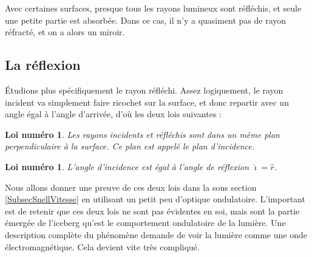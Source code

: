 \documentclass[a4paper,12pt]{book}
\newcommand{\pstTransHom}[5]{%
\pstTranslation{#1}{#2}{#3}[inter]
\pstHomO[HomCoef=#4]{#3}{inter}[#5]
}
\newcommand{\pstDecompForce}[8]{%
  \psset{PointSymbol=none, PointName=none}
\pstTranslation{#3}{#4}{#1}[ibBu]
\pstTranslation{#5}{#6}{#1}[ibBd]

\pstTranslation{#3}{#4}{#2}[jbBu]
\pstTranslation{#5}{#6}{#2}[jbBd]

\pstInterLL{#2}{jbBd}{#1}{ibBu}{#7}
\pstInterLL{#2}{jbBu}{#1}{ibBd}{#8}
}
\newcommand{\pstRayon}[3][linecolor=yellow]{%
  \psset{PointSymbol=none, PointName=none}
\pstMiddleAB{#2}{#3}{inter}
{
\psset{linecolor=red}
\psset{#1}
\psline[ArrowInside=->](#2)(#3)
} %
}
\newcommand{\pstDioptre}[8][Diinter]{%
  \psset{PointSymbol=none, PointName=none}
	\pstGeonode(#2){DiO}(#3){DiP}(#4){DiRi}
	\pstRotation[RotAngle=90]{DiO}{DiP}[DiQ]				%
   	\pstDecompForce{DiO}{DiRi}{DiO}{DiP}{DiO}{DiQ}{DiRix}{DiRiy}		%
  \FPeval{Dicoefrel}{#5/#6}
	\pstTransHom{DiRi}{DiRiy}{DiO}{\Dicoefrel}{DiRex}			%

   	\pstTranslation{DiO}{DiRex}{DiQ}[DiR]
   	\pstInterLC{DiRex}{DiR}{DiO}{DiRi}{#8}{#1}				%

	\pstTranslation{DiRi}{DiRiy}{DiRiy}[#7]					%
}
\newcounter{numloiphyz}
\theoremstyle{mes_exemples}	\newtheorem{exemple}[numtho]{Exemple}
\theoremstyle{mes_tho}
\newtheorem{loiphyz}[numloiphyz]{Loi numéro}
\begin{document}
Avec certaines surfaces, presque tous les rayons lumineux sont réfléchis, et seule une petite partie est absorbée. Dans ce cas, il n'y a quasiment pas de rayon réfracté, et on a alors un miroir.

\subsection{La réflexion}

Étudions plus spécifiquement le rayon réfléchi. Assez logiquement, le rayon incident va simplement \og faire ricochet\fg{} sur la surface, et donc repartir avec un angle égal à l'angle d'arrivée, d'où les deux lois suivantes :

\begin{loiphyz}
Les rayons incidents et réfléchis sont dans un même plan perpendiculaire à la surface. Ce plan est appelé le \emph{plan d'incidence}.
\end{loiphyz}

\begin{loiphyz}
L'angle d'incidence est égal à l'angle de réflexion $\hat \imath=\hat r$.
\end{loiphyz}

Nous allons donner une preuve de ces deux lois dans la sous section \ref{SubsecSnellVitesse} en utilisant un petit peu d'optique ondulatoire. L'important est de retenir que ces deux lois ne sont pas \og évidentes\fg{} en soi, mais sont la partie émergée de l'iceberg qu'est le comportement ondulatoire de la lumière. Une description complète du phénomène demande de voir la lumière comme une onde électromagnétique. Cela devient vite très compliqué.


\newcommand{\prefigreflexion}[1]{%

\pstGeonode(0,0){O}(2,0){P}
\pstRotation[RotAngle=90]{O}{P}[Qi]
\pstHomO[HomCoef=0.5]{O}{Qi}[Q]
\pstRotation[RotAngle=180]{O}{P}[R]
\pstHomO[HomCoef=-1]{O}{Q}[S]
\pstRotation[RotAngle=-#1]{O}{R}[Ri]		%
    \pstDioptre{O}{P}{Ri}{0.9}{2}{Rs}{Re}	%
}

\newcommand{\tracefigreflexion}{%

   \pstMarkAngle{Q}{O}{Ri}{$\hat\imath$}
   \pstMarkAngle{Rs}{O}{Q}{$\hat r$}

   \psline(R)(P)
   \psline[linecolor=lightgray](O)(Q)
   \psline[linecolor=lightgray](O)(S)

   \pstRayon{Ri}{O}
   \pstRayon{O}{Rs}
}
\end{document}
